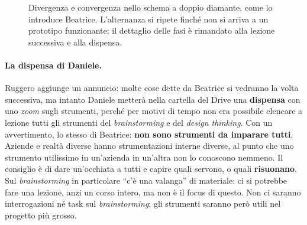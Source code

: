 \begin{figure}[htbp]
\centering
{}
\caption{Divergenza e convergenza nello schema a doppio diamante, come lo introduce
Beatrice. L'alternanza si ripete finché non si arriva a un prototipo funzionante; il
dettaglio delle fasi è rimandato alla lezione successiva e alla dispensa.}
\label{a6:fig:diamante}
\end{figure}

\paragraph{La dispensa di Daniele.} Ruggero aggiunge un annuncio: molte cose dette da
Beatrice si vedranno la volta successiva, ma intanto Daniele metterà nella cartella
del Drive una \textbf{dispensa} con uno \emph{zoom} sugli strumenti, perché per
motivi di tempo non era possibile elencare a lezione tutti gli strumenti del
\emph{brainstorming} e del \emph{design thinking}. Con un avvertimento, lo stesso di
Beatrice: \textbf{non sono strumenti da imparare tutti}. Aziende e realtà diverse
hanno strumentazioni interne diverse, al punto che uno strumento utilissimo in
un'azienda in un'altra non lo conoscono nemmeno. Il consiglio è di dare un'occhiata a
tutti e capire quali servono, o quali \textbf{risuonano}. Sul \emph{brainstorming} in
particolare ``c'è una valanga'' di materiale: ci si potrebbe fare una lezione, anzi
un corso intero, ma non è il focus di questo. Non ci saranno interrogazioni né task
sul \emph{brainstorming}; gli strumenti saranno però utili nel progetto più grosso.

